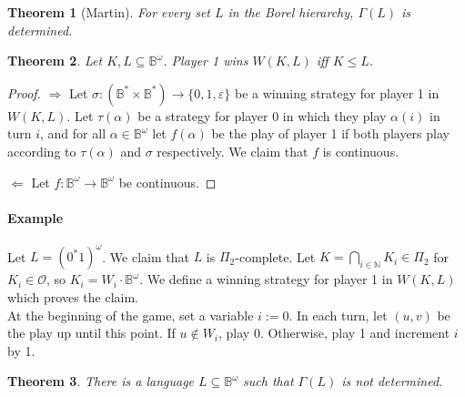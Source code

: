 \documentclass{article}
\newtheorem{theorem}{Theorem}
\begin{document}
\begin{theorem}[Martin]
	For every set $L$ in the Borel hierarchy, $\Gamma(L)$ is determined.
\end{theorem} 

\begin{theorem}
	Let $K, L \subseteq \mathbb{B}^\omega$. Player 1 wins $W(K, L)$ iff $K \leq L$.
\end{theorem}
\begin{proof}
	$\boldsymbol{\Rightarrow}$ Let $\sigma : (\mathbb{B}^* \times \mathbb{B}^*) \rightarrow \{0, 1, \varepsilon\}$ be a winning strategy for player 1 in $W(K, L)$. Let $\tau(\alpha)$ be a strategy for player 0 in which they play $\alpha(i)$ in turn $i$, and for all $\alpha \in \mathbb{B}^\omega$ let $f(\alpha)$ be the play of player 1 if both players play according to $\tau(\alpha)$ and $\sigma$ respectively. We claim that $f$ is continuous. %
	
	$\boldsymbol{\Leftarrow}$ Let $f : \mathbb{B}^\omega \rightarrow \mathbb{B}^\omega$ be continuous. %
\end{proof}

\paragraph{Example} Let $L = (0^*1)^\omega$. We claim that $L$ is $\Pi_2$-complete. Let $K = \bigcap\limits_{i \in \mathbb{N}} K_i \in \Pi_2$ for $K_i \in \mathcal{O}$, so $K_i = W_i \cdot \mathbb{B}^\omega$. We define a winning strategy for player 1 in $W(K, L)$ which proves the claim. \\
	At the beginning of the game, set a variable $i := 0$. In each turn, let $(u, v)$ be the play up until this point. If $u \notin W_i$, play 0. Otherwise, play 1 and increment $i$ by 1.
	
\begin{theorem}
	There is a language $L \subseteq \mathbb{B}^\omega$ such that $\Gamma(L)$ is not determined.
\end{theorem}
\end{document}
